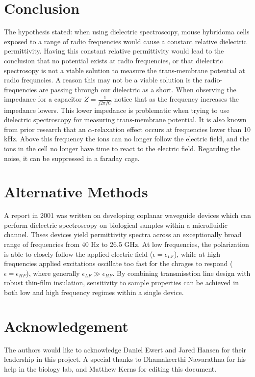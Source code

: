 \documentclass[journal]{IEEEtran}
\begin{document}
\section{Conclusion}
The hypothesis stated: when using dielectric spectroscopy, mouse hybridoma cells exposed to a range of radio frequencies would cause a constant relative dielectric permittivity. Having this constant relative permittivity would lead to the conclusion that no potential exists at radio frequencies, or that dielectric spectrosopy is not a viable solution to measure the trans-membrane potential at radio frequncies. A reason this may not be a viable solution is the radio-frequencies are passing through our dielectric as a short. When observing the impedance for a capacitor $Z = \frac{1}{j2\pi f C}$ notice that as the frequency increases the impedance lowers. This lower impedance is problematic when trying to use dielectric spectroscopy for measuring trans-membrane potential. It is also known from prior research that an $\alpha$-relaxation effect occurs at frequencies lower than 10 kHz. Above this frequency the ions can no longer follow the electric field, and the ions in the cell no longer have time to react to the electric field. Regarding the noise, it can be suppressed in a faraday cage. 

\section{Alternative Methods}
A report in 2001 was written on developing coplanar waveguide devices which can perform dielectric spectroscopy on biological samples within a microfluidic channel. Thses devices yield permittivity spectra across an exceptionally broad range of frequencies from 40 Hz to 26.5 GHz. At low frequencies, the polarization is able to closely follow the applied electric field ($\epsilon = \epsilon_{LF}$), while at high frequencies applied excitations oscillate too fast for the chrages to respond ($\epsilon=\epsilon_{HF}$), where generally $\epsilon_{LF} \gg \epsilon_{HF}$. By combining transmisstion line design with robust thin-film insulation, sensitivity to sample properties can be achieved in both low and high frequency regimes within a single device.

\section{Acknowledgement}
The authors would like to acknowledge Daniel Ewert and Jared Hansen for their leadership in this project. A special thanks to Dhamakeerthi Nawarathna for his help in the biology lab, and Matthew Kerns for editing this document.
\end{document}
